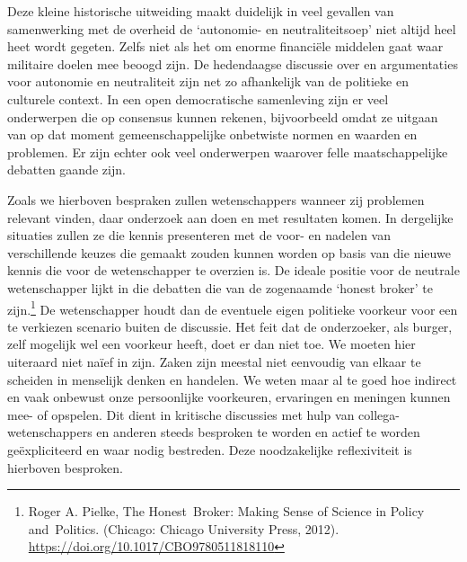 \documentclass{jote-book}
\begin{document}
	Deze kleine historische uitweiding maakt duidelijk in veel gevallen van samenwerking met de overheid de ‘autonomie- en neutraliteitsoep' niet altijd heel heet wordt gegeten. Zelfs niet als het om enorme financiële middelen gaat waar militaire doelen mee beoogd zijn. De hedendaagse discussie over en argumentaties voor autonomie en neutraliteit zijn net zo afhankelijk van de politieke en culturele context. In een open democratische samenleving zijn er veel onderwerpen die op consensus kunnen rekenen, bijvoorbeeld omdat ze uitgaan van op dat moment gemeenschappelijke onbetwiste normen en waarden en problemen. Er zijn echter ook veel onderwerpen waarover felle maatschappelijke debatten gaande zijn.



	Zoals we hierboven bespraken zullen wetenschappers wanneer zij problemen relevant vinden, daar onderzoek aan doen en met resultaten komen. In dergelijke situaties zullen ze die kennis presenteren met de voor- en nadelen van verschillende keuzes die gemaakt zouden kunnen worden op basis van die nieuwe kennis die voor de wetenschapper te overzien is. De ideale positie voor de neutrale wetenschapper lijkt in die debatten die van de zogenaamde ‘honest broker' te zijn.\footnote{Roger A. Pielke, The Honest Broker: Making Sense of Science in Policy and Politics. (Chicago: Chicago University Press, 2012). \href{about:blank}{https://doi.org/10.1017/CBO9780511818110}} De wetenschapper houdt dan de eventuele eigen politieke voorkeur voor een te verkiezen scenario buiten de discussie. Het feit dat de onderzoeker, als burger, zelf mogelijk wel een voorkeur heeft, doet er dan niet toe. We moeten hier uiteraard niet naïef in zijn. Zaken zijn meestal niet eenvoudig van elkaar te scheiden in menselijk denken en handelen. We weten maar al te goed hoe indirect en vaak onbewust onze persoonlijke voorkeuren, ervaringen en meningen kunnen mee- of opspelen. Dit dient in kritische discussies met hulp van collega-wetenschappers en anderen steeds besproken te worden en actief te worden geëxpliciteerd en waar nodig bestreden. Deze noodzakelijke reflexiviteit is hierboven besproken.
\end{document}
